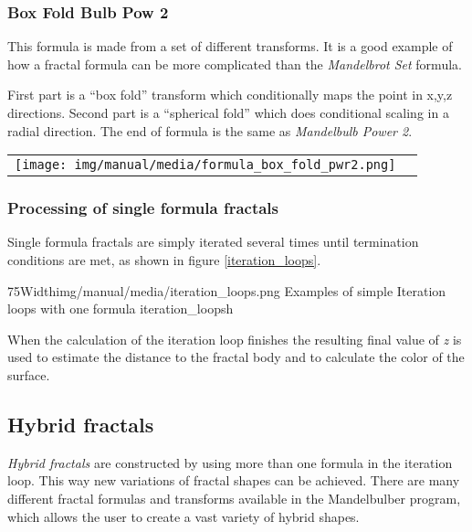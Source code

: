 \subsubsection{Box Fold Bulb Pow 2}

This formula is made from a set of different transforms. It is a good example of
how a fractal formula can be more complicated than the
\emph{Mandelbrot Set} formula.

First part is a ``box fold'' transform which conditionally maps the point in x,y,z  directions. Second part is a ``spherical fold'' which does conditional scaling in a radial direction.
The end of formula is the same as \emph{Mandelbulb Power 2}.

\begin{tabular}{l l}
	\texttt{[image: img/manual/media/formula\_box\_fold\_pwr2.png]}	
	& 
	\begin{minipage}[b]{0.5\linewidth}
		
	\end{minipage}
\end{tabular} 

\subsubsection{Processing of single formula fractals}

Single formula fractals are simply iterated several times until termination conditions are met, as shown in figure \ref{iteration_loops}. \nolinebreak \nopagebreak

\simpleImageWithCaption75Width{img/manual/media/iteration_loops.png}
{Examples of simple Iteration loops with one formula}
{iteration_loops}{h}

When the calculation of the iteration loop finishes the resulting final value of \emph{z} is
used to estimate the distance to the fractal body and to calculate the color of the surface.

\subsection{Hybrid fractals}

\emph{Hybrid fractals} are constructed by using more than one formula in the iteration loop.
This way new variations of fractal shapes can be achieved. There are many different fractal formulas and transforms available in the Mandelbulber program, which allows the user to create a vast variety of hybrid shapes.

